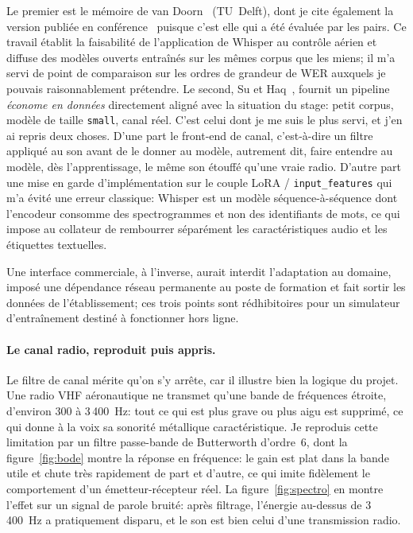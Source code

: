 \documentclass[11pt,a4paper]{article}
\begin{document}
Le premier est le mémoire de van Doorn~\cite{vandoorn} (TU~Delft), dont je cite également la version publiée en conférence~\cite{whisperatc} puisque c'est elle qui a été évaluée par les pairs. Ce travail établit la faisabilité de l'application de Whisper au contrôle aérien et diffuse des modèles ouverts entraînés sur les mêmes corpus que les miens; il m'a servi de point de comparaison sur les ordres de grandeur de WER auxquels je pouvais raisonnablement prétendre. Le second, Su et Haq~\cite{suhaq}, fournit un pipeline \emph{économe en données} directement aligné avec la situation du stage: petit corpus, modèle de taille \texttt{small}, canal réel. C'est celui dont je me suis le plus servi, et j'en ai repris deux choses. D'une part le front-end de canal, c'est-à-dire un filtre appliqué au son avant de le donner au modèle, autrement dit, faire entendre au modèle, dès l'apprentissage, le même son étouffé qu'une vraie radio. D'autre part une mise en garde d'implémentation sur le couple LoRA / \texttt{input\_features} qui m'a évité une erreur classique: Whisper est un modèle séquence-à-séquence dont l'encodeur consomme des spectrogrammes et non des identifiants de mots, ce qui impose au collateur de rembourrer séparément les caractéristiques audio et les étiquettes textuelles. 

Une interface commerciale, à l'inverse, aurait interdit l'adaptation au domaine, imposé une dépendance réseau permanente au poste de formation et fait sortir les données de l'établissement; ces trois points sont rédhibitoires pour un simulateur d'entraînement destiné à fonctionner hors ligne.

\paragraph{Le canal radio, reproduit puis appris.} Le filtre de canal mérite qu'on s'y arrête, car il illustre bien la logique du projet. Une radio VHF aéronautique ne transmet qu'une bande de fréquences étroite, d'environ 300 à 3\,400~Hz: tout ce qui est plus grave ou plus aigu est supprimé, ce qui donne à la voix sa sonorité métallique caractéristique. Je reproduis cette limitation par un filtre passe-bande de Butterworth d'ordre~6, dont la figure~\ref{fig:bode} montre la réponse en fréquence: le gain est plat dans la bande utile et chute très rapidement de part et d'autre, ce qui imite fidèlement le comportement d'un émetteur-récepteur réel. La figure~\ref{fig:spectro} en montre l'effet sur un signal de parole bruité: après filtrage, l'énergie au-dessus de 3\,400~Hz a pratiquement disparu, et le son est bien celui d'une transmission radio.
\end{document}
